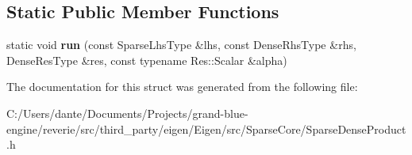 \subsection*{Static Public Member Functions}
\begin{DoxyCompactItemize}
\item 
\mbox{\label{struct_eigen_1_1internal_1_1sparse__time__dense__product__impl_3_01_sparse_lhs_type_00_01_dense_67299fc86a44049a87b7e209695d23ff_a0c2606fafd49c91c7bf7f96ffcb139d2}} 
static void {\bfseries run} (const Sparse\+Lhs\+Type \&lhs, const Dense\+Rhs\+Type \&rhs, Dense\+Res\+Type \&res, const typename Res\+::\+Scalar \&alpha)
\end{DoxyCompactItemize}


The documentation for this struct was generated from the following file\+:\begin{DoxyCompactItemize}
\item 
C\+:/\+Users/dante/\+Documents/\+Projects/grand-\/blue-\/engine/reverie/src/third\+\_\+party/eigen/\+Eigen/src/\+Sparse\+Core/Sparse\+Dense\+Product.\+h\end{DoxyCompactItemize}
